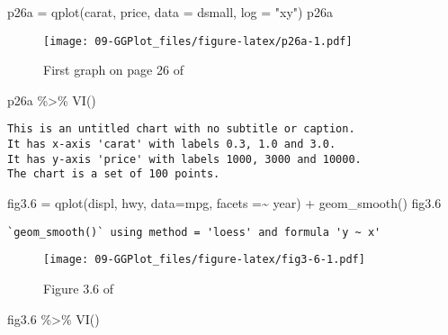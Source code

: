 \documentclass[
]{book}
\newenvironment{Shaded}{\begin{snugshade}}{\end{snugshade}}
\newcommand{\AttributeTok}[1]{\textcolor[rgb]{0.77,0.63,0.00}{#1}}
\newcommand{\FloatTok}[1]{\textcolor[rgb]{0.00,0.00,0.81}{#1}}
\newcommand{\FunctionTok}[1]{\textcolor[rgb]{0.00,0.00,0.00}{#1}}
\newcommand{\NormalTok}[1]{#1}
\newcommand{\OtherTok}[1]{\textcolor[rgb]{0.56,0.35,0.01}{#1}}
\newcommand{\SpecialCharTok}[1]{\textcolor[rgb]{0.00,0.00,0.00}{#1}}
\newcommand{\StringTok}[1]{\textcolor[rgb]{0.31,0.60,0.02}{#1}}
\begin{document}
\begin{Shaded}
\begin{Highlighting}[]
\NormalTok{p26a }\OtherTok{=} \FunctionTok{qplot}\NormalTok{(carat, price, }\AttributeTok{data =}\NormalTok{ dsmall, }\AttributeTok{log =} \StringTok{"xy"}\NormalTok{)   }
\NormalTok{p26a}
\end{Highlighting}
\end{Shaded}

\begin{figure}
\centering
\texttt{[image: 09-GGPlot\_files/figure-latex/p26a-1.pdf]}
\caption{\label{fig:p26a}First graph on page 26 of}
\end{figure}

\begin{Shaded}
\begin{Highlighting}[]
\NormalTok{p26a }\SpecialCharTok{\%\textgreater{}\%} \FunctionTok{VI}\NormalTok{()   }
\end{Highlighting}
\end{Shaded}

\begin{verbatim}
This is an untitled chart with no subtitle or caption.
It has x-axis 'carat' with labels 0.3, 1.0 and 3.0.
It has y-axis 'price' with labels 1000, 3000 and 10000.
The chart is a set of 100 points.
\end{verbatim}

\begin{Shaded}
\begin{Highlighting}[]
\NormalTok{fig3}\FloatTok{.6} \OtherTok{=} \FunctionTok{qplot}\NormalTok{(displ, hwy, }\AttributeTok{data=}\NormalTok{mpg, }\AttributeTok{facets =}\SpecialCharTok{\textasciitilde{}}\NormalTok{ year) }\SpecialCharTok{+} \FunctionTok{geom\_smooth}\NormalTok{()    }
\NormalTok{fig3}\FloatTok{.6}
\end{Highlighting}
\end{Shaded}

\begin{verbatim}
`geom_smooth()` using method = 'loess' and formula 'y ~ x'
\end{verbatim}

\begin{figure}
\centering
\texttt{[image: 09-GGPlot\_files/figure-latex/fig3-6-1.pdf]}
\caption{\label{fig:fig3-6}Figure 3.6 of}
\end{figure}

\begin{Shaded}
\begin{Highlighting}[]
\NormalTok{fig3}\FloatTok{.6} \SpecialCharTok{\%\textgreater{}\%} \FunctionTok{VI}\NormalTok{()   }
\end{Highlighting}
\end{Shaded}
\end{document}
